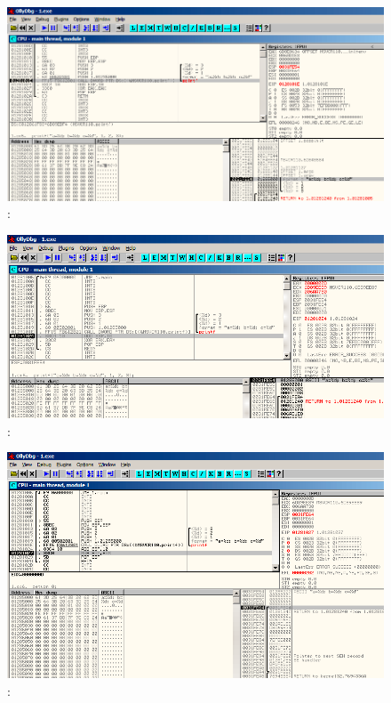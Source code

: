 \begin{figure}[H]
\centering
\includegraphics[scale=\FigScale]{patterns/03_printf/olly3_2.png}
\caption{\olly:  \printf{}}
\label{fig:printf3_olly_2}
\end{figure}

\begin{figure}[H]
\centering
\includegraphics[scale=\FigScale]{patterns/03_printf/olly3_3.png}
\caption{\olly:  \printf{}}
\label{fig:printf3_olly_3}
\end{figure}

\begin{figure}[H]
\centering
\includegraphics[scale=\FigScale]{patterns/03_printf/olly3_4.png}
\caption{\olly:  }
\label{fig:printf3_olly_4}
\end{figure}

